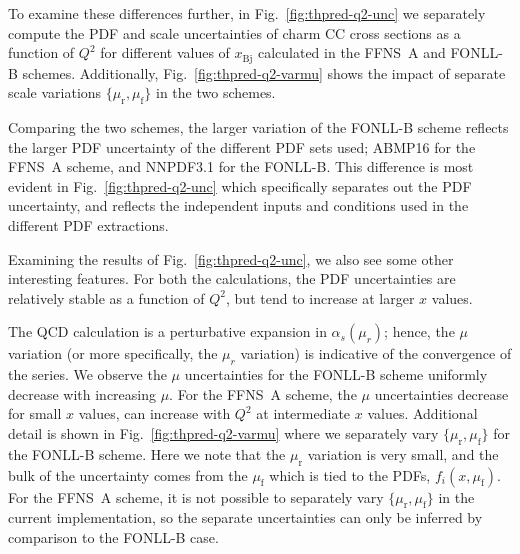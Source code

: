 \documentclass[pdftex,twocolumn,epjc3]{svjour3}          %
\newcommand{\xbj}{\ensuremath{x_{\text{Bj}}}\xspace}
\newcommand{\fonll} {{FONLL-B}\xspace}
\newcommand{\ffns} {{FFNS~A}\xspace}
\begin{document}
To examine these differences further, in Fig.~\ref{fig:thpred-q2-unc}
we separately compute the PDF and scale uncertainties of charm CC
cross sections as a function of $Q^2$ for different values of \xbj
calculated in the \ffns and \fonll schemes.
%
Additionally, Fig.~\ref{fig:thpred-q2-varmu} shows the impact of
separate scale variations $\{\mu_\mathrm{r} , \mu_\mathrm{f}\}$ in the
two schemes.


Comparing the two schemes, the larger variation of the  \fonll scheme
reflects the larger PDF uncertainty of the different PDF sets used;
ABMP16 for the  \ffns scheme, and NNPDF3.1 for the  \fonll.
%
This difference is most evident in  Fig.~\ref{fig:thpred-q2-unc} which
specifically separates out the PDF uncertainty, and  reflects
the independent inputs and conditions used in the different  PDF extractions. 

Examining the results of Fig.~\ref{fig:thpred-q2-unc}, we also see
some other interesting features.
%
For both the calculations, the 
PDF uncertainties are relatively stable as a function of $Q^2$, but
tend to increase at larger $x$ values.
%

The QCD calculation is a perturbative expansion in $\alpha_s(\mu_r)$;
hence, the  $\mu$ variation (or more specifically, the $\mu_r$ variation)
is indicative of the convergence of the series. 
%
We observe 
the $\mu$ uncertainties for the  \fonll scheme uniformly decrease with increasing $\mu$.
%
For the  \ffns scheme, the $\mu$ uncertainties decrease for small $x$ values,
can increase with $Q^2$ at intermediate $x$ values.
%
Additional detail is shown in  Fig.~\ref{fig:thpred-q2-varmu}
where we separately vary $\{\mu_\mathrm{r} , \mu_\mathrm{f}\}$
for the  \fonll scheme.
Here we note that the $\mu_\mathrm{r}$ variation is very small,
and the bulk  of the uncertainty comes from the  $\mu_\mathrm{f}$ which is tied to the
PDFs, $f_i(x,\mu_\mathrm{f})$.
%
For the  \ffns scheme, it is not possible to  separately vary $\{\mu_\mathrm{r} , \mu_\mathrm{f}\}$
in the current implementation, so  the separate uncertainties can only be inferred
by comparison to the \fonll case. 
\end{document}
